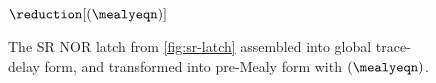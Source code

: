 \begin{figure}
    \centering
    \(\reduction[(\mealyeqn)]\)
    \caption{
        The SR NOR latch from \cref{fig:sr-latch} assembled into global
        trace-delay form, and transformed into pre-Mealy form with
        \((\mealyeqn)\).
    }
    \label{fig:sr-latch-global-trace-delay}
\end{figure}